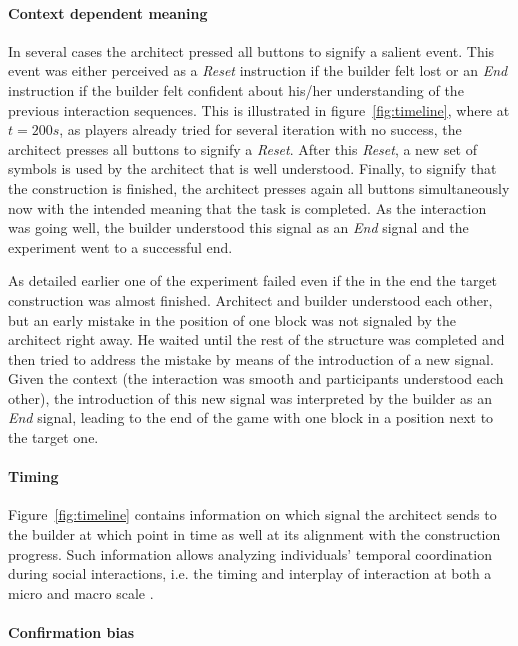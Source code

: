 \paragraph{Context dependent meaning} 

In several cases the architect pressed all buttons to signify a salient event. This event was either perceived as a \emph{Reset} instruction if the builder felt lost or an \emph{End} instruction if the builder felt confident about his/her understanding of the previous interaction sequences. This is illustrated in figure~\ref{fig:timeline}, where at $t=200 s$, as players already tried for several iteration with no success, the architect presses all buttons to signify a \emph{Reset}. After this \emph{Reset}, a new set of symbols is used by the architect that is well understood. Finally, to signify that the construction is finished, the architect presses again all buttons simultaneously now with the intended meaning that the task is completed. As the interaction was going well, the builder understood this signal as an \emph{End} signal and the experiment went to a successful end.

As detailed earlier one of the experiment failed even if the in the end the target construction was almost finished. Architect and builder understood each other, but an early mistake in the position of one block was not signaled by the architect right away. He waited until the rest of the structure was completed and then tried to address the mistake by means of the introduction of a new signal. Given the context (the interaction was smooth and participants understood each other), the introduction of this new signal was interpreted by the builder as an \emph{End} signal, leading to the end of the game with one block in a position next to the target one.

\paragraph{Timing} 

Figure~\ref{fig:timeline} contains information on which signal the architect sends to the builder at which point in time as well at its alignment with the construction progress. Such information allows analyzing individuals' temporal coordination during social interactions, i.e. the timing and interplay of interaction at both a micro and macro scale \cite{delaherche2012interpersonal}.

\paragraph{Confirmation bias} 

